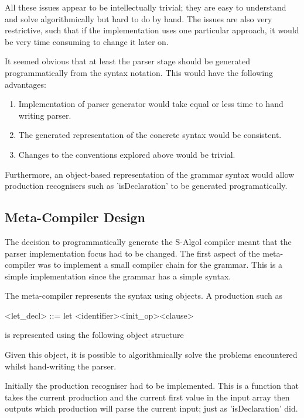 \documentclass{article}
\begin{document}
All these issues appear to be intellectually trivial; they are easy to understand and solve algorithmically but hard to do by hand. The issues are also very restrictive, such that if the implementation uses one particular approach, it would be very time consuming to change it later on.

It seemed obvious that at least the parser stage should be generated programmatically from the syntax notation. This would have the following advantages:

\begin{enumerate}
\item Implementation of parser generator would take equal or less time to hand writing parser.
\item The generated representation of the concrete syntax would be consistent.
\item Changes to the conventions explored above would be trivial.
\end{enumerate}

Furthermore, an object-based representation of the grammar syntax would allow production recognisers such as 'isDeclaration' to be generated programatically.

\subsection{Meta-Compiler Design}

The decision to programmatically generate the S-Algol compiler meant that the parser implementation focus had to be changed. The first aspect of the meta-compiler was to implement a small compiler chain for the grammar. This is a simple implementation since the grammar has a simple syntax.  

The meta-compiler represents the syntax using objects. A production such as 

<let_decl> ::= let <identifier><init_op><clause>

is represented using the following object structure


Given this object, it is possible to algorithmically solve the problems encountered whilst hand-writing the parser.

Initially the production recogniser had to be implemented. This is a function that takes the current production and the current first value in the input array then outputs which production will parse the current input; just as 'isDeclaration' did.
\end{document}
